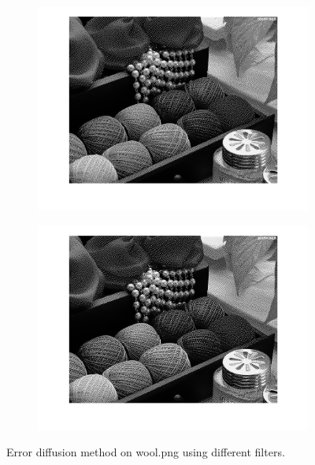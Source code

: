 \documentclass{article}
\begin{document}
\begin{figure}
        \centering
        \begin{subfigure}[b]{0.49\textwidth}
            \includegraphics[width=\textwidth]{Images/wool_error_diffusion_floyd.png}
        \end{subfigure}
        \begin{subfigure}[b]{0.49\textwidth}
            \includegraphics[width=\textwidth]{Images/wool_error_diffusion_stucki.png}
        \end{subfigure}
        \caption{Error diffusion method on \textsf{wool.png} using different filters.}
        \label{fig:error_diff_wool}
\end{figure}
\end{document}
